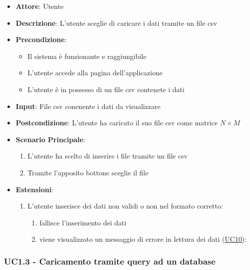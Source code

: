    \begin{itemize}
    \item \textbf{Attore}: Utente
    \item \textbf{Descrizione}: L'utente sceglie di caricare i dati tramite un file csv
    \item \textbf{Precondizione}:
    \begin{itemize}
        \item Il sistema è funzionante e raggiungibile
        \item L'utente accede alla pagina dell'applicazione
        \item L'utente è in possesso di un file csv contenete i dati
    \end{itemize}
    \item \textbf{Input}: File csv conenente i dati da visualizzare
    \item \textbf{Postcondizione}: L'utente ha caricato il suo file csv come matrice $N\times M$
    \item \textbf{Scenario Principale}: 
        \begin{enumerate}
            \item L'utente ha scelto di inserire i file tramite un file csv
            \item Tramite l'apposito bottone sceglie il file
        \end{enumerate}
        \item \textbf{Estensioni}:
        \begin{enumerate}
            \item L'utente inserisce dei dati non validi o non nel formato corretto:
                \begin{enumerate}
                    \item fallisce l'inserimento dei dati
                    \item viene visualizzato un messaggio di errore in lettura dei dati (\hyperref[uc10]{UC10}):
                \end{enumerate}
        \end{enumerate}  
    \end{itemize}

    
    \subsubsection{UC1.3 - Caricamento tramite query ad un database}
    \label{uc1.3}
    
